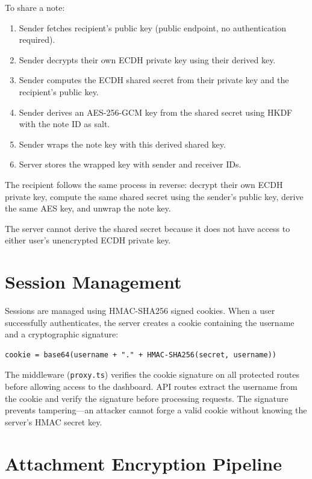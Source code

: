 To share a note:
\begin{enumerate}
    \item Sender fetches recipient's public key (public endpoint, no authentication required).
    \item Sender decrypts their own ECDH private key using their derived key.
    \item Sender computes the ECDH shared secret from their private key and the recipient's public key.
    \item Sender derives an AES-256-GCM key from the shared secret using HKDF with the note ID as salt.
    \item Sender wraps the note key with this derived shared key.
    \item Server stores the wrapped key with sender and receiver IDs.
\end{enumerate}

The recipient follows the same process in reverse: decrypt their own ECDH private key, compute the same shared secret using the sender's public key, derive the same AES key, and unwrap the note key.

The server cannot derive the shared secret because it does not have access to either user's unencrypted ECDH private key.

\section{Session Management}

Sessions are managed using HMAC-SHA256 signed cookies. When a user successfully authenticates, the server creates a cookie containing the username and a cryptographic signature:

\begin{verbatim}
cookie = base64(username + "." + HMAC-SHA256(secret, username))
\end{verbatim}

The middleware (\texttt{proxy.ts}) verifies the cookie signature on all protected routes before allowing access to the dashboard. API routes extract the username from the cookie and verify the signature before processing requests. The signature prevents tampering---an attacker cannot forge a valid cookie without knowing the server's HMAC secret key.

\section{Attachment Encryption Pipeline}


